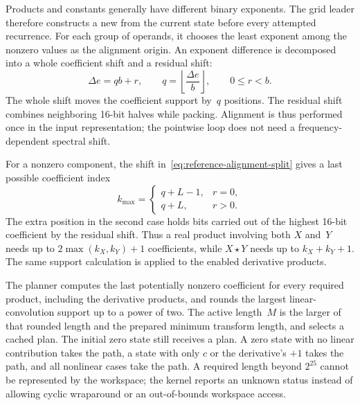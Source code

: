 Products and constants generally have different binary exponents.  The grid
leader therefore constructs a new  from the
current state before every attempted recurrence.  For each group of operands, it
chooses the least exponent among the nonzero values as the alignment origin.
An exponent difference is decomposed into a whole coefficient shift and a
residual shift:
\begin{equation}
  \Delta e = qb+r,
  \qquad
  q=\left\lfloor\frac{\Delta e}{b}\right\rfloor,
  \qquad
  0\le r<b.
  \label{eq:reference-alignment-split}
\end{equation}
The whole shift moves the coefficient support by~$q$ positions.  The residual
shift combines neighboring 16-bit halves while packing.  Alignment is thus
performed once in the input representation; the pointwise loop does not need
a frequency-dependent spectral shift.

For a nonzero component, the shift in~\eqref{eq:reference-alignment-split}
gives a last possible coefficient index
\begin{equation}
  k_{\max}=
  \begin{cases}
    q+L-1, & r=0, \\
    q+L, & r>0.
  \end{cases}
  \label{eq:reference-packed-support}
\end{equation}
The extra position in the second case holds bits carried out of the highest
16-bit coefficient by the residual shift.  Thus a real product involving both
$X$ and~$Y$ needs up to $2\max(k_X,k_Y)+1$ coefficients, while $X\star Y$
needs up to $k_X+k_Y+1$.  The same support calculation is applied to the
enabled derivative products.

The planner computes the last potentially nonzero coefficient for every
required product, including the derivative products, and rounds the largest
linear-convolution support up to a power of two.  The active length~$M$ is the
larger of that rounded length and the prepared minimum transform length, and
selects a cached plan.  The initial zero state still receives a plan.  A
zero state with no linear contribution takes the
 path, a state with only $c$ or the derivative's $+1$ takes the
 path, and all nonlinear cases take the  path.  A
required length beyond $2^{25}$ cannot be represented by the workspace; the
kernel reports an unknown status instead of allowing cyclic wraparound or an
out-of-bounds workspace access.

